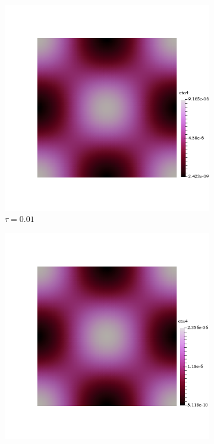 \begin{figure}[h!]
  \centering
  \begin{subfigure}[b]{0.24\textwidth}
    \includegraphics[width=\textwidth,height=\textheight,keepaspectratio,height=\textheight,keepaspectratio]{figures/2_mpet/no_transfer/time/eta4_dt1.png}
    \caption{$\tau=0.01$}
  \end{subfigure}
  \begin{subfigure}[b]{0.24\textwidth}
    \includegraphics[width=\textwidth,height=\textheight,keepaspectratio,height=\textheight,keepaspectratio]{figures/2_mpet/no_transfer/time/eta4_dt2.png}

\end{subfigure}
\end{figure}
